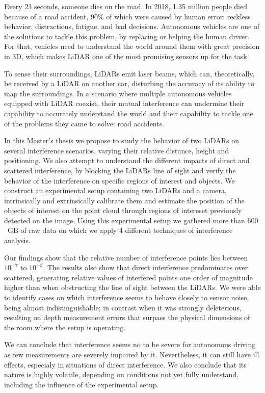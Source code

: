 Every 23 seconds, someone dies on the road. In 2018, 1.35 million people died because of a road accident, 90\% of which were caused by human error: reckless behavior, distractions, fatigue, and bad decisions. Autonomous vehicles are one of the solutions to tackle this problem, by replacing or helping the human driver. For that, vehicles need to understand the world around them with great precision in 3D, which makes LiDAR one of the most promising sensors up for the task. 

To sense their surroundings, LiDARs emit laser beams, which can, theoretically, be received by a LiDAR on another car, disturbing the accuracy of its ability to map the surroundings. In a scenario where multiple autonomous vehicles equipped with LiDAR coexist, their mutual interference can undermine their capability to accurately understand the world and their capability to tackle one of the problems they came to solve: road accidents. 

In this Master's thesis we propose to study the behavior of two LiDARs on several interference scenarios, varying their relative distance, height and positioning. We also attempt to understand the different impacts of direct and scattered interference, by blocking the LiDARs line of sight and verify the behavior of the interference on specific regions of interest and objects. We construct an experimental setup containing two LiDARs and a camera, intrinsically and extrinsically calibrate them and estimate the position of the objects of interest on the point cloud through regions of intereset previously detected on the image. Using this experimental setup we gathered more than $600$~GB of raw data on which we apply 4 different techniques of interference analysis.

Our findings show that the relative number of interference points lies between $10^{-7}$ to $10^{-3}$. The results also show that direct interference predominates over scattered, generating relative values of interfered points one order of magnitude higher than when obstructing the line of sight between the LiDARs. We were able to identify cases on which interference seems to behave closely to sensor noise, being almost indistinguishable; in contrast when it was strongly deleterious, resulting on depth measurement errors that surpass the physical dimensions of the room where the setup is operating. 

We can conclude that interference seems no to be severe for autonomous driving as few measurements are severely impaired by it. Nevertheless, it can still have ill effects, especialy in situations of direct interference. We also conclude that its nature is highly volatile, depending on conditions not yet fully understand, including the influence of the experimental setup.





